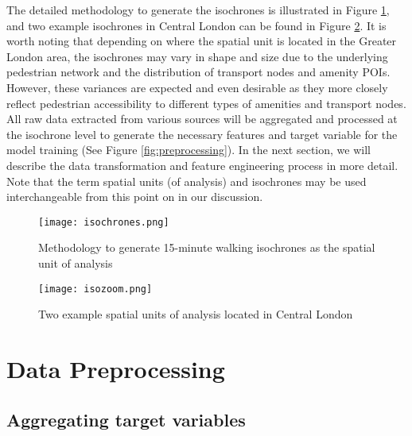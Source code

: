 The detailed methodology to generate the isochrones is illustrated in Figure \ref{fig:isochrones}, and two example isochrones in Central London can be found in Figure \ref{fig:isozoom}. It is worth noting that depending on where the spatial unit is located in the Greater London area, the isochrones may vary in shape and size due to the underlying pedestrian network and the distribution of transport nodes and amenity POIs. However, these variances are expected and even desirable as they more closely reflect pedestrian accessibility to different types of amenities and transport nodes. All raw data extracted from various sources will be aggregated and processed at the isochrone level to generate the necessary features and target variable for the model training (See Figure \ref{fig:preprocessing}). In the next section, we will describe the data transformation and feature engineering process in more detail. Note that the term spatial units (of analysis) and isochrones may be used interchangeable from this point on in our discussion.

\begin{figure}[ht]
    \centering
    \texttt{[image: isochrones.png]}
    \captionsetup{justification=centering}
    \caption{Methodology to generate 15-minute walking isochrones as the spatial unit of analysis}
    \label{fig:isochrones}
\end{figure}

\begin{figure}[!ht]
    \centering
    \texttt{[image: isozoom.png]}
    \caption{Two example spatial units of analysis located in Central London}
    \label{fig:isozoom}
\end{figure}




\pagebreak[4] %
\section{Data Preprocessing}
\subsection{Aggregating target variables}


